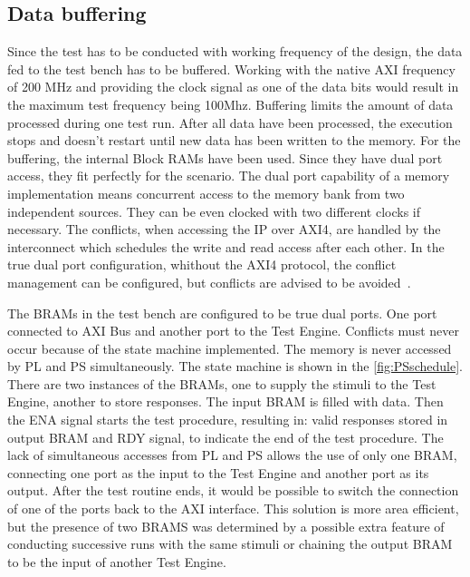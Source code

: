 \subsection{Data buffering}
Since the test has to be conducted with working frequency of the design, the data fed to the test bench has to be buffered. Working with the native AXI frequency of 200 MHz and providing the clock signal as one of the data bits would result in the maximum test frequency being 100Mhz. Buffering limits the amount of data processed during one test run. After all data have been processed, the execution stops and doesn't restart until new data has been written to the memory. For the buffering, the internal Block RAMs have been used. Since they have dual port access, they fit perfectly for the scenario. The dual port capability of a memory implementation means concurrent access to the memory bank from two independent sources. They can be even clocked with two different clocks if necessary. The conflicts, when accessing the IP over AXI4, are handled by the interconnect which schedules the write and read access after each other. In the true dual port configuration, whithout the AXI4 protocol, the conflict management can be configured, but conflicts are advised to be avoided~\cite{report:BRAM}.

The BRAMs in the test bench are configured to be true dual ports. One port connected to AXI Bus and another port to the Test Engine. Conflicts must never occur because of the state machine implemented. The memory is never accessed by PL and PS simultaneously. The state machine is shown in the \autoref{fig:PSschedule}. There are two instances of the BRAMs, one to supply the stimuli to the Test Engine, another to store responses. The input BRAM is filled with data. Then the ENA signal starts the test procedure, resulting in: valid responses stored in output BRAM and RDY signal, to indicate the end of the test procedure. The lack of simultaneous accesses from PL and PS allows the use of only one BRAM, connecting one port as the input to the Test Engine and another port as its output. After the test routine ends, it would be possible to switch the connection of one of the ports back to the AXI interface. This solution is more area efficient, but the presence of two BRAMS was determined by a possible extra feature of conducting successive runs with the same stimuli or chaining the output BRAM to be the input of another Test Engine. 

